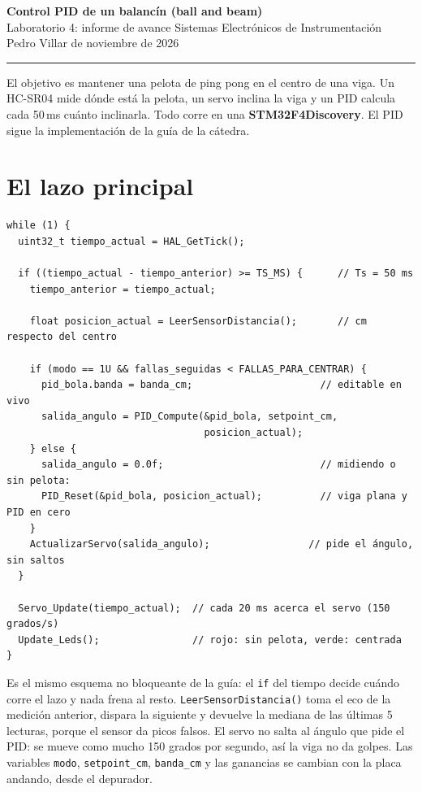 \documentclass[11pt,a4paper]{article}
\begin{document}
\begin{center}
  {\large\bfseries Control PID de un balancín (ball and beam)}\\[2pt]
  {\small Laboratorio 4: informe de avance \textbar{} Sistemas Electrónicos de Instrumentación}\\[2pt]
  {\footnotesize Pedro Villar \quad\textbar{} de noviembre de 2026}
\end{center}
\vspace{-4pt}
\hrule
\vspace{4pt}

El objetivo es mantener una pelota de ping pong en el centro de una viga. Un HC-SR04 mide dónde
está la pelota, un servo inclina la viga y un PID calcula cada 50\,ms cuánto inclinarla. Todo
corre en una \textbf{STM32F4Discovery}. El PID sigue la implementación de la guía de la
cátedra.

\section*{El lazo principal}

\begin{lstlisting}
while (1) {
  uint32_t tiempo_actual = HAL_GetTick();

  if ((tiempo_actual - tiempo_anterior) >= TS_MS) {      // Ts = 50 ms
    tiempo_anterior = tiempo_actual;

    float posicion_actual = LeerSensorDistancia();       // cm respecto del centro

    if (modo == 1U && fallas_seguidas < FALLAS_PARA_CENTRAR) {
      pid_bola.banda = banda_cm;                      // editable en vivo
      salida_angulo = PID_Compute(&pid_bola, setpoint_cm,
                                  posicion_actual);
    } else {
      salida_angulo = 0.0f;                           // midiendo o sin pelota:
      PID_Reset(&pid_bola, posicion_actual);          // viga plana y PID en cero
    }
    ActualizarServo(salida_angulo);                 // pide el ángulo, sin saltos
  }

  Servo_Update(tiempo_actual);  // cada 20 ms acerca el servo (150 grados/s)
  Update_Leds();                // rojo: sin pelota, verde: centrada
}
\end{lstlisting}

Es el mismo esquema no bloqueante de la guía: el \texttt{if} del tiempo decide cuándo corre el
lazo y nada frena al resto. \texttt{LeerSensorDistancia()} toma el eco de la medición anterior,
dispara la siguiente y devuelve la mediana de las últimas 5 lecturas, porque el sensor da picos
falsos. El servo no salta al ángulo que pide el PID: se mueve como mucho 150 grados por segundo,
así la viga no da golpes. Las variables \texttt{modo}, \texttt{setpoint\_cm}, \texttt{banda\_cm}
y las ganancias se cambian con la placa andando, desde el depurador.
\end{document}

